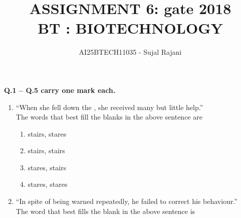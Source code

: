 \documentclass[journal,12pt,onecolumn]{IEEEtran}
\theoremstyle{remark}
\begin{document}
\title{
ASSIGNMENT 6: gate 2018 \\
    BT : BIOTECHNOLOGY }
\author{AI25BTECH11035 - Sujal Rajani }
\maketitle
\renewcommand{\thefigure}{\theenumi}
\renewcommand{\thetable}{\theenumi}

    

\textbf{Q.1 -- Q.5 carry one mark each.}
\begin{enumerate}
   
    \item ``When she fell down the \underline{\hspace{2cm}}, she received many \underline{\hspace{2cm}} but little help.''\\
    The words that best fill the blanks in the above sentence are
    \begin{multicols}{2}
    \begin{enumerate}
        \item stairs, stares
        \item stairs, stairs
        \item stares, stairs
        \item stares, stares
    \end{enumerate}
\end{multicols}

    \item ``In spite of being warned repeatedly, he failed to correct his \underline{\hspace{2cm}} behaviour.''\\
    The word that best fills the blank in the above sentence is
    \begin{multicols}{4}
        

\end{multicols}
\end{enumerate}
\end{document}
